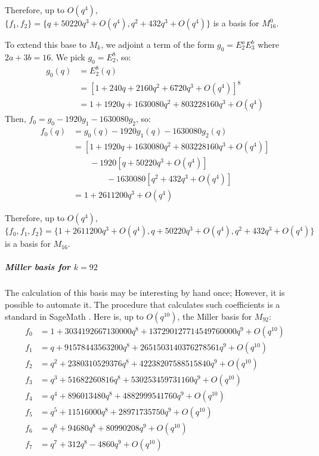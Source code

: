Therefore, up to $O(q^4)$, $\{f_1, f_2\}=\{q + 50220q^3 + O(q^4), q^2 + 432q^3 + O(q^4)\}$ is a basis for $M_{16}^0$.

To extend this base to $M_k$, we adjoint a term of the form $g_0 = E_2^aE_3^b$ where $2a+3b=16$. We pick $g_0 = E_2^8$, so:
\begin{align*}
    g_0(q) &= E_2^8(q)\\
           &= \left[ 1 + 240q + 2160q^2 + 6720q^3 + O(q^4) \right]^8\\
           &= 1 + 1920q + 1630080q^2 + 803228160q^3 + O(q^4)
\end{align*}
Then, $f_0 = g_0 - 1920g_1 - 1630080g_2$, so:
\begin{align*}
    f_0(q) &= g_0(q) - 1920g_1(q) - 1630080g_2(q)\\
           &= \left[ 1 + 1920q + 1630080q^2 + 803228160q^3 + O(q^4) \right]\\
           & \qquad - 1920 \left[ q + 50220q^3 + O(q^4) \right] \\
           & \qquad \qquad - 1630080 \left[ q^2 + 432q^3 + O(q^4) \right]\\
           &= 1 + 2611200q^3 + O(q^4)
\end{align*}

Therefore, up to $O(q^4)$, $\{f_0, f_1, f_2\} = \{1 + 2611200q^3 + O(q^4), q + 50220q^3 + O(q^4), q^2 + 432q^3 + O(q^4)\}$ is a basis for $M_{16}$.

\subparagraph{Miller basis for $k=92$}
The calculation of this basis may be interesting by hand once;
However, it is possible to automate it.
The procedure that calculates such coefficients is a standard in SageMath \cite{sage}.
Here is, up to $O(q^{10})$, the Miller basis for $M_{92}$:
\begin{align*}
	f_0 &= 1 + 3034192667130000 q^8 + 137290127714549760000 q^9 + O(q^{10})\\
	f_1 &= q + 91578443563200 q^8 + 2651503140376278561 q^9 + O(q^{10})\\
	f_2 &= q^2 + 2380310529376 q^8 + 42238207588515840 q^9 + O(q^{10})\\
	f_3 &= q^3 + 51682260816 q^8 + 530253459731160 q^9 + O(q^{10})\\
	f_4 &= q^4 + 896013480 q^8 + 4882999541760 q^9 + O(q^{10})\\
	f_5 &= q^5 + 11516000 q^8 + 28971735750 q^9 + O(q^{10})\\
	f_6 &= q^6 + 94680 q^8 + 80990208 q^9 + O(q^{10})\\
	f_7 &= q^7 + 312 q^8 - 4860 q^9 + O(q^{10})\\
\end{align*}



